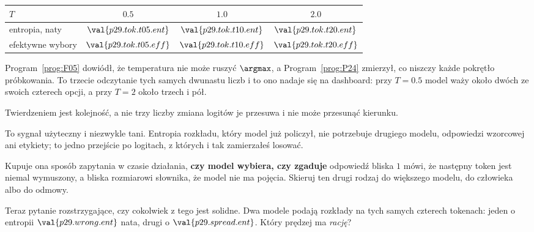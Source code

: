 \begin{fr}

\begin{center}
\begin{tabular}{lccc}
\toprule
$T$ & $\num{0.5}$ & $\num{1.0}$ & $\num{2.0}$ \\
\midrule
entropia, naty & $\val{p29.tok.t05.ent}$ & $\val{p29.tok.t10.ent}$
  & $\val{p29.tok.t20.ent}$ \\
efektywne wybory & $\val{p29.tok.t05.eff}$ & $\val{p29.tok.t10.eff}$
  & $\val{p29.tok.t20.eff}$ \\
\bottomrule
\end{tabular}
\end{center}

Program~\ref{prog:F05} dowiódł, że temperatura nie może ruszyć $\argmax$, a
Program~\ref{prog:P24} zmierzył, co niszczy każde pokrętło próbkowania. To
trzecie odczytanie tych samych dwunastu liczb i to ono nadaje się na
dashboard: przy $T = \num{0.5}$ model waży około dwóch ze swoich czterech
opcji, a przy $T = 2$ około trzech i pół.

Twierdzeniem jest kolejność, a nie trzy liczby \dash{} zmiana logitów je
przesuwa i nie może przesunąć kierunku.
\end{fr}

\begin{fr}
To sygnał użyteczny i niezwykle tani. Entropia rozkładu, który model już
policzył, nie potrzebuje drugiego modelu, odpowiedzi wzorcowej ani etykiety;
to jedno przejście po logitach, z których i tak zamierzałeś losować.

Kupuje ona sposób zapytania w czasie działania, \textbf{czy model wybiera, czy
zgaduje} \dash{} odpowiedź bliska $1$ mówi, że następny token jest niemal
wymuszony, a bliska rozmiarowi słownika, że model nie ma pojęcia. Skieruj ten
drugi rodzaj do większego modelu, do człowieka albo do odmowy.

Teraz pytanie rozstrzygające, czy cokolwiek z tego jest solidne. Dwa modele
podają rozkłady na tych samych czterech tokenach: jeden o entropii
$\val{p29.wrong.ent}$ nata, drugi o $\val{p29.spread.ent}$. Który prędzej ma
\emph{rację}?
\dotline
\nextframe
\end{fr}

